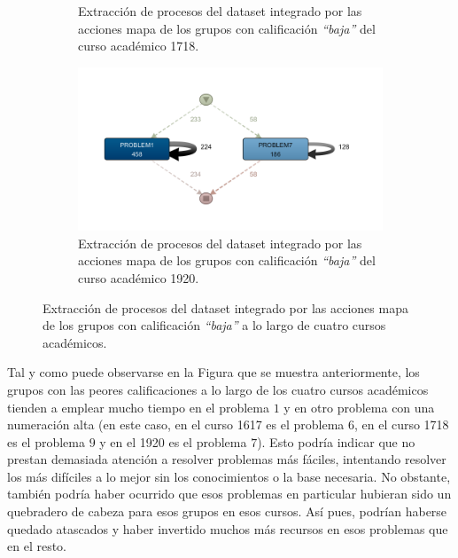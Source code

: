 \begin{figure}[H]
\begin{subfigure}[t]{0.60\textwidth}
    \caption{Extracción de procesos del dataset integrado por las acciones mapa de los grupos con calificación \emph{``baja''} del curso académico 1718.}
    \label{fig:mapYear1718WorstGrades}
  \end{subfigure}
  \hfill
  \begin{subfigure}[t]{0.60\textwidth}
    \includegraphics[width=1.10\textwidth, height=0.80\textwidth]{imagenes/DISCO_map/Dataset FusionadoYear1920WorstGrades.png}
    \caption{Extracción de procesos del dataset integrado por las acciones mapa de los grupos con calificación \emph{``baja''} del curso académico 1920.}
    \label{fig:mapYear1920WorstGrades}
  \end{subfigure}
  \caption{Extracción de procesos del dataset integrado por las acciones mapa de los grupos con calificación \emph{``baja''} a lo largo de cuatro cursos académicos.}
\end{figure}

Tal y como puede observarse en la Figura que se muestra anteriormente, los grupos con las peores calificaciones a lo largo de los cuatro cursos académicos tienden a emplear mucho tiempo en el problema $1$ y en otro problema con una numeración alta (en este caso, en el curso 1617 es el problema $6$, en el curso 1718 es el problema $9$ y en el 1920 es el problema $7$). Esto podría indicar que no prestan demasiada atención a resolver problemas más fáciles, intentando resolver los más difíciles a lo mejor sin los conocimientos o la base necesaria. No obstante, también podría haber ocurrido que esos problemas en particular hubieran sido un quebradero de cabeza para esos grupos en esos cursos. Así pues, podrían haberse quedado atascados y haber invertido muchos más recursos en esos problemas que en el resto.

